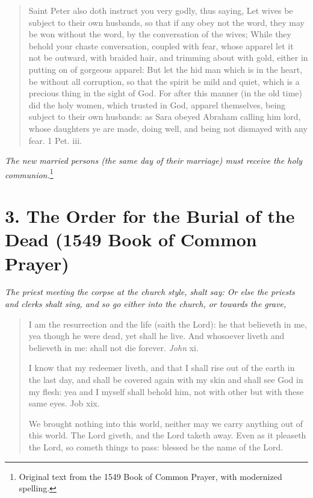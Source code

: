 \documentclass[
]{book}
\begin{document}
\begin{quote}
Saint Peter also doth instruct you very godly, thus saying, Let wives be subject to their own husbands, so that if any obey not the word, they may be won without the word, by the conversation of the wives; While they behold your chaste conversation, coupled with fear, whose apparel let it not be outward, with braided hair, and trimming about with gold, either in putting on of gorgeous apparel: But let the hid man which is in the heart, be without all corruption, so that the spirit be mild and quiet, which is a precious thing in the sight of God. For after this manner (in the old time) did the holy women, which trusted in God, apparel themselves, being subject to their own husbands: as Sara obeyed Abraham calling him lord, whose daughters ye are made, doing well, and being not dismayed with any fear. 1 Pet. iii.
\end{quote}

\begin{center}
\emph{The new married persons (the same day of their marriage) must receive the holy communion.}\footnote{Original text from the 1549 Book of Common Prayer, with modernized spelling.}

\end{center}

\protect\hypertarget{chapter-slug-3-the-order-for-the-burial-of-the-dead-1549-book-of-common-prayer}{\href{}{}}

\hypertarget{the-order-for-the-burial-of-the-dead-1549-book-of-common-prayer}{%
\section*{3. The Order for the Burial of the Dead (1549 Book of Common Prayer)}\label{the-order-for-the-burial-of-the-dead-1549-book-of-common-prayer}}

\begin{center}
\protect\hypertarget{appendix2.3}{\href{}{}}\emph{The priest meeting the corpse at the church style, shalt say: Or else the priests and clerks shalt sing, and so go either into the church, or towards the grave,}

\end{center}

\begin{quote}
I am the resurrection and the life (saith the Lord): he that believeth in me, yea though he were dead, yet shall he live. And whosoever liveth and believeth in me: shall not die forever. \emph{John} xi.

I know that my redeemer liveth, and that I shall rise out of the earth in the last day, and shall be covered again with my skin and shall see God in my flesh: yea and I myself shall behold him, not with other but with these same eyes. Job xix.

We brought nothing into this world, neither may we carry anything out of this world. The Lord giveth, and the Lord taketh away. Even as it pleaseth the Lord, so cometh things to pass: blessed be the name of the Lord.
\end{quote}
\end{document}

